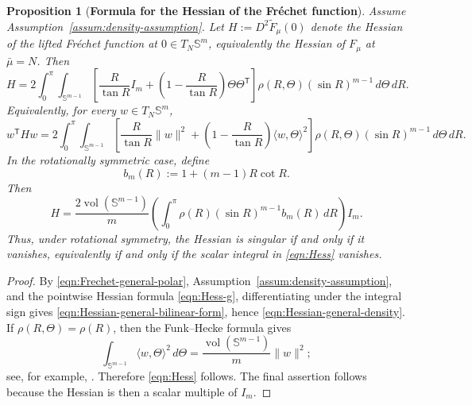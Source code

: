 \documentclass{amsart}
\newtheorem{proposition}[theorem]{Proposition}
\theoremstyle{definition}
\theoremstyle{remark}
\newcommand{\mubar}{\bar{\mu}}
\newcommand\0{\boldsymbol{0}}
\begin{document}
\begin{proposition}[\textbf{Formula for the Hessian of the Fréchet function}]
\label{prop:Hessian-common}
Assume Assumption~\ref{assum:density-assumption}.  Let \(H:=D^2\widetilde F_\mu(0)\) denote the Hessian of the lifted Fr\'echet function at \(0\in T_N\mathbb S^m\), equivalently the Hessian of \(F_\mu\) at \(\mubar=N\).  Then
\begin{equation}
\label{eqn:Hessian-general-density}
\boxed{
    H
    =
    2\int_0^\pi\!\!\int_{\mathbb S^{m-1}}
    \left[
    \frac{R}{\tan R}I_m+
    \left(1-\frac{R}{\tan R}\right)\Theta\Theta^{\mathsf T}
    \right]
    \rho(R,\Theta)(\sin R)^{m-1}\,d\Theta\,dR .
}
\end{equation}
Equivalently, for every \(w\in T_N\mathbb S^m\),
\begin{equation}
\label{eqn:Hessian-general-bilinear-form}
    w^{\mathsf T}Hw
    =
    2\int_0^\pi\!\!\int_{\mathbb S^{m-1}}
    \left[
    \frac{R}{\tan R}\|w\|^2+
    \left(1-\frac{R}{\tan R}\right)\langle w,\Theta\rangle^2
    \right]\rho(R,\Theta)(\sin R)^{m-1}\,d\Theta\,dR .
\end{equation}
In the rotationally symmetric case, define
\begin{equation}\label{eqn:b}
    b_m(R):=1+(m-1)R\cot R .
\end{equation}
Then
\begin{equation}
\label{eqn:Hess}
\boxed{
    H
    =
    \frac{2\operatorname{vol}(\mathbb S^{m-1})}{m}
    \left(\int_0^\pi \rho(R)(\sin R)^{m-1}b_m(R)\,dR\right)I_m .
}
\end{equation}
Thus, under rotational symmetry, the Hessian is singular if and only if it vanishes, equivalently if and only if the scalar integral in \eqref{eqn:Hess} vanishes.
\end{proposition}

\begin{proof}
By \eqref{eqn:Frechet-general-polar}, Assumption~\ref{assum:density-assumption}, and the pointwise Hessian formula \eqref{eqn:Hess-g}, differentiating under the integral sign gives \eqref{eqn:Hessian-general-bilinear-form}, hence \eqref{eqn:Hessian-general-density}.  If \(\rho(R,\Theta)=\rho(R)\), then the Funk--Hecke formula gives
\[
    \int_{\mathbb S^{m-1}}\langle w,\Theta\rangle^2\,d\Theta
    =
    \frac{\operatorname{vol}(\mathbb S^{m-1})}{m}\|w\|^2;
\]
see, for example, \citet{ChafaiFunkHecke}.  Therefore \eqref{eqn:Hess} follows.  The final assertion follows because the Hessian is then a scalar multiple of \(I_m\).
\end{proof}
\end{document}
